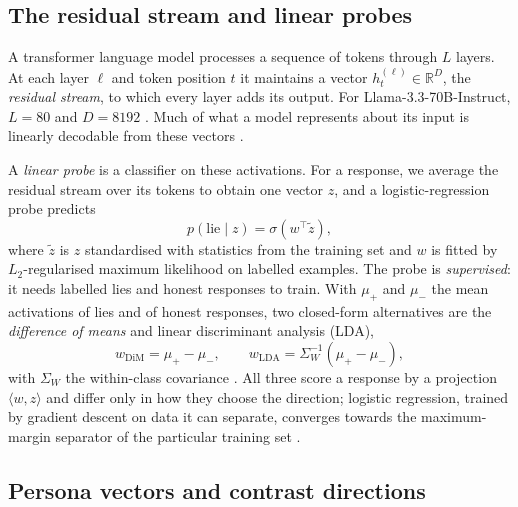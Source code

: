 \subsection{The residual stream and linear probes}
\label{sec:prelim-probes}

A transformer language model processes a sequence of tokens through $L$ layers. At each layer
$\ell$ and token position $t$ it maintains a vector $h^{(\ell)}_t \in \mathbb{R}^{D}$, the
\emph{residual stream}, to which every layer adds its output. For Llama-3.3-70B-Instruct, $L = 80$
and $D = 8192$ \cite{grattafiori2024llama}. Much of what a model represents about its input is
linearly decodable from these vectors \cite{alain2016understanding,marks2023geometry}.

A \emph{linear probe} is a classifier on these activations. For a response, we average the
residual stream over its tokens to obtain one vector $z$, and a logistic-regression probe predicts
\begin{equation}
  p(\text{lie} \mid z) = \sigma\!\left(w^\top \tilde z\right),
  \label{eq:lr}
\end{equation}
where $\tilde z$ is $z$ standardised with statistics from the training set and $w$ is fitted by
$L_2$-regularised maximum likelihood on labelled examples. The probe is \emph{supervised}: it needs
labelled lies and honest responses to train. With $\mu_{+}$ and $\mu_{-}$ the mean activations of
lies and of honest responses, two closed-form alternatives are the \emph{difference of means} and
linear discriminant analysis (LDA),
\begin{equation}
  w_{\mathrm{DiM}} = \mu_{+} - \mu_{-}, \qquad
  w_{\mathrm{LDA}} = \Sigma_{W}^{-1}\left(\mu_{+} - \mu_{-}\right),
  \label{eq:dim}
\end{equation}
with $\Sigma_W$ the within-class covariance \cite{marks2023geometry}. All three score a response by a
projection $\langle w, z\rangle$ and differ only in how they choose the direction; logistic
regression, trained by gradient descent on data it can separate, converges towards the
maximum-margin separator of the particular training set \cite{soudry2018implicit}.

\subsection{Persona vectors and contrast directions}
\label{sec:prelim-persona}

